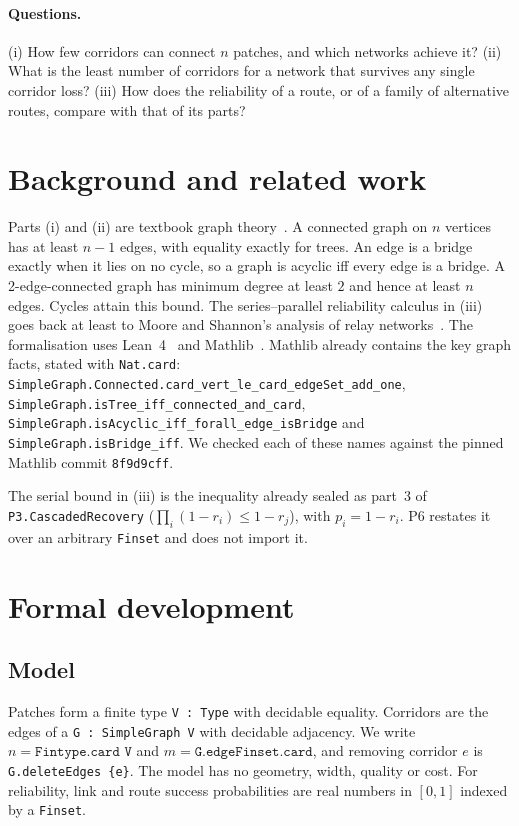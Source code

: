 \documentclass[11pt]{article}
\begin{document}
\paragraph{Questions.} (i) How few corridors can connect $n$ patches, and which networks achieve it?
(ii) What is the least number of corridors for a network that survives any single corridor loss?
(iii) How does the reliability of a route, or of a family of alternative routes, compare with that of its parts?

\section{Background and related work}
Parts (i) and (ii) are textbook graph theory~\citep{diestel2017}. A connected graph on $n$ vertices
has at least $n-1$ edges, with equality exactly for trees. An edge is a bridge exactly when it lies on
no cycle, so a graph is acyclic iff every edge is a bridge. A 2-edge-connected graph has minimum
degree at least $2$ and hence at least $n$ edges. Cycles attain this bound. The series--parallel
reliability calculus in (iii) goes back at least to Moore and Shannon's analysis of relay
networks~\citep{mooreshannon1956}. The formalisation uses Lean~4~\citep{lean4} and
Mathlib~\citep{mathlib2020}. Mathlib already contains the key graph facts, stated with
\texttt{Nat.card}:
\texttt{SimpleGraph.Connected.card\_vert\_le\_card\_edgeSet\_add\_one},
\texttt{SimpleGraph.isTree\_iff\_connected\_and\_card},
\texttt{SimpleGraph.isAcyclic\_iff\_forall\_edge\_isBridge} and \texttt{SimpleGraph.isBridge\_iff}.
We checked each of these names against the pinned Mathlib commit \texttt{8f9d9cff}.

The serial bound in (iii) is the inequality already sealed as part~3 of \texttt{P3.CascadedRecovery}
($\prod_i(1-r_i)\le 1-r_j$), with $p_i=1-r_i$. P6 restates it over an arbitrary \texttt{Finset}
and does not import it.

\section{Formal development}
\subsection{Model}
Patches form a finite type \texttt{V : Type} with decidable equality. Corridors are the edges of a
\texttt{G : SimpleGraph V} with decidable adjacency. We write $n=\texttt{Fintype.card V}$ and
$m=\texttt{G.edgeFinset.card}$, and removing corridor $e$ is \texttt{G.deleteEdges \{e\}}. The model has no geometry,
width, quality or cost. For reliability, link and route success probabilities are real numbers in
$[0,1]$ indexed by a \texttt{Finset}.
\end{document}
